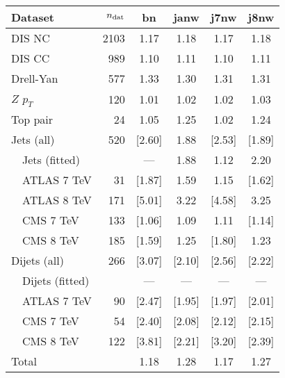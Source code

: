 \begin{tabularx}{\textwidth}{Xrcccc}
    \toprule
     Dataset                    & $n_{\rm dat}$ &    bn   &  janw  &      j7nw  &      j8nw  \\
    \midrule
     DIS NC                     &       2103  &    1.17  &  1.18  &    1.17  &    1.18  \\
     DIS CC                     &        989  &    1.10  &  1.11  &    1.10  &    1.11  \\
     Drell-Yan                  &        577  &    1.33  &  1.30  &    1.31  &    1.31  \\
     $Z$ $p_T$                  &        120  &    1.01  &  1.02  &    1.02  &    1.03  \\
     Top pair                   &         24  &    1.05  &  1.25  &    1.02  &    1.24  \\
     Jets (all)                 &        520  &  [2.60] &  1.88  &  [2.53] &  [1.89] \\
     \ \ Jets (fitted)          &             &    ---   &  1.88  &    1.12    &  2.20  \\
     \ \ ATLAS 7 TeV            &         31  &  [1.87] &  1.59  &   1.15   & [1.62] \\
     \ \ ATLAS 8 TeV            &        171  &  [5.01] &  3.22  &  [4.58]   &  3.25  \\
     \ \ CMS   7 TeV            &        133  &  [1.06] &  1.09  &    1.11   & [1.14] \\
     \ \ CMS   8 TeV            &        185  &  [1.59] &  1.25  &  [1.80]   &  1.23  \\
     Dijets (all)               &        266  &  [3.07] & [2.10] &  [2.56]  & [2.22] \\
     \ \ Dijets (fitted)        &             &    ---   &  ---   &    ---      &  ---   \\
     \ \ ATLAS 7 TeV            &         90  &  [2.47] & [1.95] &  [1.97]  & [2.01] \\
     \ \ CMS   7 TeV            &         54  &  [2.40] & [2.08] &  [2.12]  & [2.15] \\
     \ \ CMS   8 TeV            &        122  &  [3.81] & [2.21] &  [3.20]  & [2.39] \\
    \midrule
     Total                      &             &   1.18   &  1.28  &   1.17    &  1.27  \\
    \bottomrule
    \end{tabularx}
